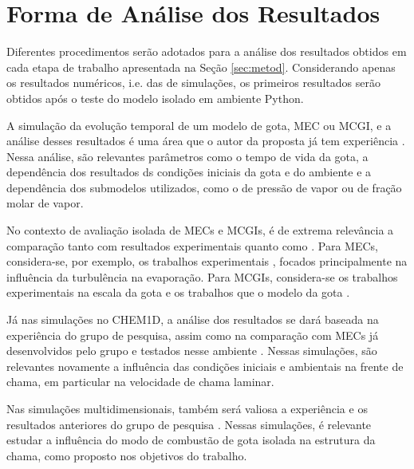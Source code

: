 

\section{Forma de Análise dos Resultados} \label{sec:resultados}

Diferentes procedimentos serão adotados para a análise dos resultados obtidos em cada etapa de trabalho apresentada na Seção \ref{sec:metod}.
Considerando apenas os resultados numéricos, i.e. das de simulações, os primeiros resultados serão obtidos após o teste do modelo isolado em ambiente Python. 

A simulação da evolução temporal de um modelo de gota, MEC ou MCGI, e a análise desses resultados é uma área que o autor da proposta já tem experiência \cite{HenningsJ2024MT}. 
Nessa análise, são relevantes parâmetros como o tempo de vida da gota, a dependência dos resultados ds condições iniciais da gota e do ambiente e a dependência dos submodelos utilizados, como o de pressão de vapor ou de fração molar de vapor.

No contexto de avaliação isolada de MECs e MCGIs, é de extrema relevância a comparação tanto com resultados experimentais quanto como .
Para MECs, considera-se, por exemplo, os trabalhos experimentais \cite{BiroukM2006,PatelU2019,KayaEyiceD2024,ArabkhalajA2024,MaquaC2008}, focados principalmente na influência da turbulência na evaporação.
Para MCGIs, considera-se os trabalhos experimentais na escala da gota \cite{ChoS1990SCI,CandelS1999,ChenG1996CF,Xu2002,BiroukM2000,CuociA2005,SetyawanH2015} e os trabalhos que  o modelo da gota \cite{Stauch2006,CuociA2005,ChoS1990SCI,KazakovA2003CF,MarcheseA1996CF,WangW2024}.

Já nas simulações no CHEM1D, a análise dos resultados se dará baseada na experiência do grupo de pesquisa, assim como na comparação com MECs já desenvolvidos pelo grupo e testados nesse ambiente \cite{SacomanoF2018CTM,SacomanoF2019IJHMT,SacomanoF2021Fluids,SacomanoF2024CF,SacomanoF2025CF}.
Nessas simulações, são relevantes novamente a influência das condições iniciais e ambientais na frente de chama, em particular na velocidade de chama laminar.

Nas simulações multidimensionais, também será valiosa a experiência e os resultados anteriores do grupo de pesquisa \cite{SacomanoF2017CF,SacomanoF2020CF}.
Nessas simulações, é relevante estudar a influência do modo de combustão de gota isolada na estrutura da chama, como proposto nos objetivos do trabalho.